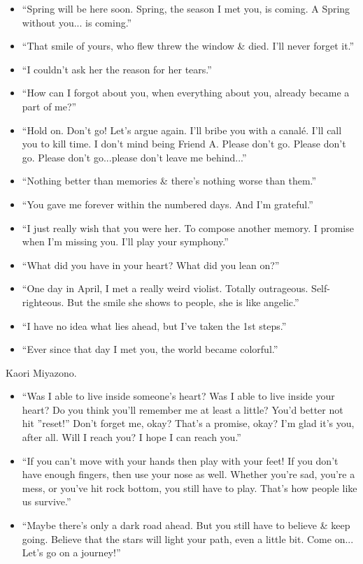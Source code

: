 \documentclass{article}
\begin{document}
\begin{enumerate}
\begin{itemize}
    	\item ``Spring will be here soon. Spring, the season I met you, is coming. A Spring without you... is coming.''
    	\item ``That smile of yours, who flew threw the window \& died. I'll never forget it.''
    	\item ``I couldn't ask her the reason for her tears.''
    	\item ``How can I forgot about you, when everything about you, already became a part of me?''
    	\item ``Hold on. Don't go! Let's argue again. I'll bribe you with a canalé. I'll call you to kill time. I don't mind being Friend A. Please don't go. Please don't go. Please don't go...please don't leave me behind...''
    	\item ``Nothing better than memories \& there's nothing worse than them.''
    	\item ``You gave me forever within the numbered days. And I'm grateful.''
    	\item ``I just really wish that you were her. To compose another memory. I promise when I'm missing you. I'll play your symphony.''
    	\item ``What did you have in your heart? What did you lean on?''
    	\item ``One day in April, I met a really weird violist. Totally outrageous. Self-righteous. But the smile she shows to people, she is like angelic.''
    	\item ``I have no idea what lies ahead, but I've taken the 1st steps.''
    	\item ``Ever since that day I met you, the world became colorful.''
    \end{itemize}
    {\sc Kaori Miyazono.}
    \begin{itemize}
    	\item ``Was I able to live inside someone's heart? Was I able to live inside your heart? Do you think you'll remember me at least a little? You'd better not hit ''reset!'' Don't forget me, okay? That's a promise, okay? I'm glad it's you, after all. Will I reach you? I hope I can reach you.''
    	\item ``If you can't move with your hands then play with your feet! If you don't have enough fingers, then use your nose as well. Whether you're sad, you're a mess, or you've hit rock bottom, you still have to play. That's how people like us survive.''
    	\item ``Maybe there's only a dark road ahead. But you still have to believe \& keep going. Believe that the stars will light your path, even a little bit. Come on... Let's go on a journey!''

\end{itemize}
\end{enumerate}
\end{document}
